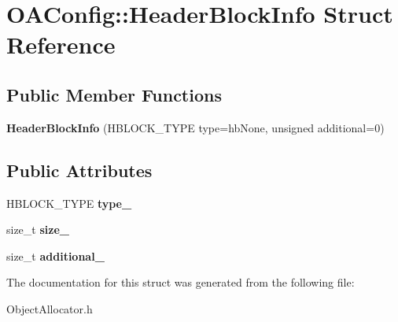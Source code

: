 \hypertarget{structOAConfig_1_1HeaderBlockInfo}{\section{O\-A\-Config\-:\-:Header\-Block\-Info Struct Reference}
\label{structOAConfig_1_1HeaderBlockInfo}
}
\subsection*{Public Member Functions}
\begin{DoxyCompactItemize}
\item 
\hypertarget{structOAConfig_1_1HeaderBlockInfo_a4cf2cea9fdd52fec942d0746f094e5f8}{{\bfseries Header\-Block\-Info} (H\-B\-L\-O\-C\-K\-\_\-\-T\-Y\-P\-E type=hb\-None, unsigned additional=0)}\label{structOAConfig_1_1HeaderBlockInfo_a4cf2cea9fdd52fec942d0746f094e5f8}

\end{DoxyCompactItemize}
\subsection*{Public Attributes}
\begin{DoxyCompactItemize}
\item 
\hypertarget{structOAConfig_1_1HeaderBlockInfo_a475b9a930ba8b63c1244ad7308467cfc}{H\-B\-L\-O\-C\-K\-\_\-\-T\-Y\-P\-E {\bfseries type\-\_\-}}\label{structOAConfig_1_1HeaderBlockInfo_a475b9a930ba8b63c1244ad7308467cfc}

\item 
\hypertarget{structOAConfig_1_1HeaderBlockInfo_ac18553c734c873e7bc1efb0e4c62d3e8}{size\-\_\-t {\bfseries size\-\_\-}}\label{structOAConfig_1_1HeaderBlockInfo_ac18553c734c873e7bc1efb0e4c62d3e8}

\item 
\hypertarget{structOAConfig_1_1HeaderBlockInfo_af99732e7667a763d1eeb454b3f15fb32}{size\-\_\-t {\bfseries additional\-\_\-}}\label{structOAConfig_1_1HeaderBlockInfo_af99732e7667a763d1eeb454b3f15fb32}

\end{DoxyCompactItemize}


The documentation for this struct was generated from the following file\-:\begin{DoxyCompactItemize}
\item 
Object\-Allocator.\-h\end{DoxyCompactItemize}
